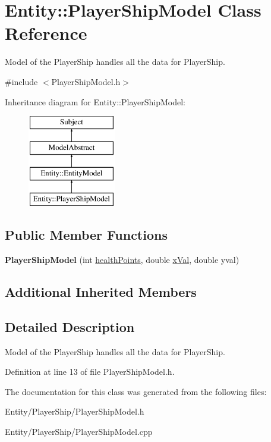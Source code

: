 \hypertarget{classEntity_1_1PlayerShipModel}{}\section{Entity\+:\+:Player\+Ship\+Model Class Reference}
\label{classEntity_1_1PlayerShipModel}


Model of the Player\+Ship handles all the data for Player\+Ship.  




{\ttfamily \#include $<$Player\+Ship\+Model.\+h$>$}

Inheritance diagram for Entity\+:\+:Player\+Ship\+Model\+:\begin{figure}[H]
\begin{center}
\leavevmode
\includegraphics[height=4.000000cm]{classEntity_1_1PlayerShipModel}
\end{center}
\end{figure}
\subsection*{Public Member Functions}
\begin{DoxyCompactItemize}
\item 
\mbox{\label{classEntity_1_1PlayerShipModel_a73b7bd832860e875ea8ef8dd3c254f7f}} 
{\bfseries Player\+Ship\+Model} (int \hyperlink{classEntity_1_1EntityModel_a975263695b038cb5d11218226526c734}{health\+Points}, double \hyperlink{classEntity_1_1EntityModel_aac6eb5f2b4e0b953a104e6aac0de6f22}{x\+Val}, double yval)
\end{DoxyCompactItemize}
\subsection*{Additional Inherited Members}


\subsection{Detailed Description}
Model of the Player\+Ship handles all the data for Player\+Ship. 

Definition at line 13 of file Player\+Ship\+Model.\+h.



The documentation for this class was generated from the following files\+:\begin{DoxyCompactItemize}
\item 
Entity/\+Player\+Ship/Player\+Ship\+Model.\+h\item 
Entity/\+Player\+Ship/Player\+Ship\+Model.\+cpp\end{DoxyCompactItemize}
